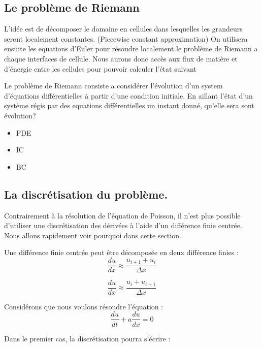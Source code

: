 \subsection{Le problème de Riemann}
L'idée est de décomposer le domaine en cellules dans lesquelles les grandeurs seront localement constantes. (Piecewise constant approximation)
On utilisera ensuite les equations d'Euler pour résoudre localement le problème de Riemann a chaque interfaces de cellule.
Nous aurons donc accès aux flux de matière et d'énergie entre les cellules pour pouvoir calculer l'état suivant  

Le problème de Riemann consiste a considérer l’évolution d'un system d’équations différentielles à partir d'une condition initiale.
En aillant l’état d'un système régis par des equations différentielles un instant donné, qu'elle sera sont évolution?

\begin{itemize}
\item PDE
\item IC
\item BC
\end{itemize}

\subsection{La discrétisation du problème.}

Contrairement à la résolution de l’équation de Poisson, il n'est plus possible d'utiliser une discrétisation des dérivées à l'aide d'un différence finie centrée.
Nous allons rapidement voir pourquoi dans cette section.

Une différence finie centrée peut être décomposée en deux différence finies : 
\begin{equation}
\frac{d u}{dx} \approx \frac{u_{i+1}  + u_i}{\Delta x} 
\end{equation}

\begin{equation}
\frac{d u}{dx} \approx \frac{u_i  + u_{i+1}}{\Delta x} 
\end{equation}

Considérons que nous voulons résoudre l'équation :
\begin{equation}
\frac{du}{dt} + a\frac{du}{dx} = 0
\end{equation}

Dans le premier cas, la discrétisation pourra s'écrire : 

